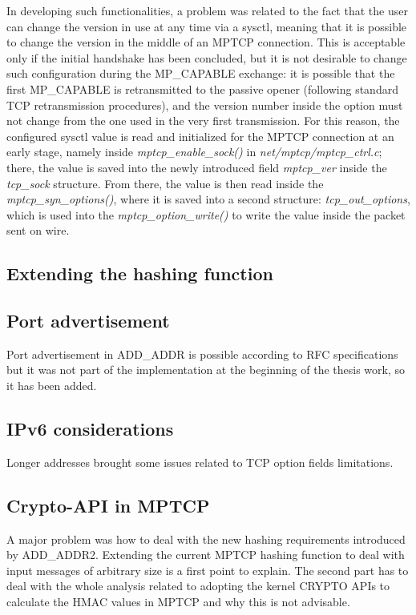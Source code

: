 In developing such functionalities, a problem was related to the fact that the user can change the version in use at any time via a sysctl, meaning that it is possible to change the version in the middle of an MPTCP connection. This is acceptable only if the initial handshake has been concluded, but it is not desirable to change such configuration during the MP\_CAPABLE exchange: it is possible that the first MP\_CAPABLE is retransmitted to the passive opener (following standard TCP retransmission procedures), and the version number inside the option must not change from the one used in the very first transmission. For this reason, the configured sysctl value is read and initialized for the MPTCP connection at an early stage, namely inside \textit{mptcp\_enable\_sock()} in \textit{net/mptcp/mptcp\_ctrl.c}; there, the value is saved into the newly introduced field \textit{mptcp\_ver} inside the \textit{tcp\_sock} structure. From there, the value is then read inside the \textit{mptcp\_syn\_options()}, where it is saved into a second structure: \textit{tcp\_out\_options}, which is used into the \textit{mptcp\_option\_write()} to write the value inside the packet sent on wire.


\subsection{Extending the hashing function}
\label{newhash}

\subsection{Port advertisement}
\label{portad}
Port advertisement in ADD\_ADDR is possible according to RFC specifications but it was not part of the implementation at the beginning of the thesis work, so it has been added.

\subsection{IPv6 considerations}
Longer addresses brought some issues related to TCP option fields limitations.

\subsection{Crypto-API in MPTCP}
A major problem was how to deal with the new hashing requirements introduced by ADD\_ADDR2. Extending the current MPTCP hashing function to deal with input messages of arbitrary size is a first point to explain. The second part has to deal with the whole analysis related to adopting the kernel CRYPTO APIs to calculate the HMAC values in MPTCP and why this is not advisable.

